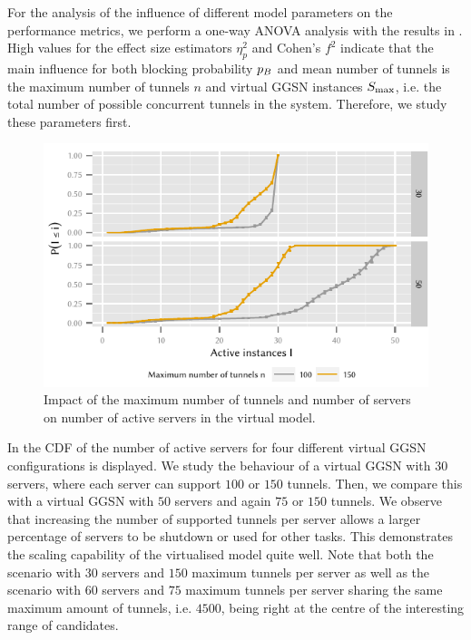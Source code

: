 For the analysis of the influence of different model parameters on the performance metrics, we perform a one-way ANOVA analysis with the results in .
High values for the effect size estimators \(\eta_p^2\) and Cohen's \(f^2\)\cite{Ellis2010} indicate that the main influence for both blocking probability \(p_B\) and mean number of tunnels is the maximum number of tunnels \(n\) and virtual \gls{GGSN} instances \(S_{\max}\), i.e. the total number of possible concurrent tunnels in the system.
Therefore, we study these parameters first.

\begin{figure}
  \centering
  \includegraphics{cloud/virtualized_network_functions/performance_evaluation/figures/instanceuse_multiserver}
  \caption{Impact of the maximum number of tunnels and number of servers on number of active servers in the virtual  model.}
  \label{fig:cloud:virtualized_network_functions:performance_evaluation:virtual_ggsn:instanceuse_multiserver}
\end{figure}

In  the \gls{CDF} of the number of active servers for four different virtual \gls{GGSN} configurations is displayed.
We study the behaviour of a virtual \gls{GGSN} with \(30\) servers, where each server can support \(100\) or \(150\) tunnels.  
Then, we compare this with a virtual \gls{GGSN} with \(50\) servers and again \(75\) or \(150\) tunnels.
We observe that increasing the number of supported tunnels per server allows a larger percentage of servers to be shutdown or used for other tasks. This demonstrates the scaling capability of the virtualised model quite well.
Note that both the scenario with \(30\) servers and \(150\) maximum tunnels per server as well as the scenario with \(60\) servers and \(75\) maximum tunnels per server sharing the same maximum amount of tunnels, i.e. \(4500\), being right at the centre of the interesting range of candidates.

